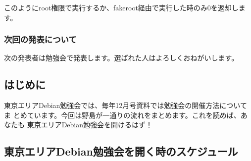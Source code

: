 \documentclass[mingoth,a4paper]{jsarticle}
\begin{document}
このようにroot権限で実行するか、fakeroot経由で実行した時のみ0を返却します。

\subsubsection{次回の発表について}

次の発表者は勉強会で発表します。選ばれた人はよろしくおねがいします。


\subsection{はじめに}

東京エリアDebian勉強会では、毎年12月号資料では勉強会の開催方法についてま
とめています。今回は野島が一通りの流れをまとめます。これを読めば、あなたも
東京エリアDebian勉強会を開けるはず！

\subsection{東京エリアDebian勉強会を開く時のスケジュール}

\end{document}
